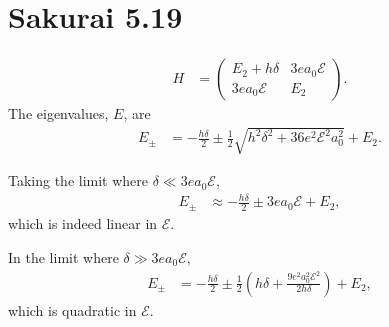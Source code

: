 \documentclass[
a4paper,
10pt,
twoside,
]{article}
\begin{document}
\section{Sakurai 5.19}\label{sec: III}

\begin{align}
	H &= \begin{pmatrix}
		E_2 + h\delta & 3ea_0\mathcal{E}\\
		3ea_0\mathcal{E} & E_2
	\end{pmatrix}.
\end{align}
The eigenvalues, $E$, are
\begin{align}
	E_\pm &= -\frac{h \delta}{2} \pm \frac{1}{2}\sqrt{h^2\delta^2 + 36e^2\mathcal{E}^2 a_0^2} + E_2.
\end{align}

Taking the limit where $\delta\ll 3ea_0\mathcal{E}$,
\begin{align}
	E_\pm &\approx -\frac{h \delta}{2} \pm 3ea_0\mathcal{E} + E_2,
\end{align}
which is indeed linear in $\mathcal{E}$.

In the limit where $\delta\gg 3ea_0\mathcal{E}$,
\begin{align}
	E_\pm &= -\frac{h \delta}{2} \pm \frac{1}{2}\left(h\delta + \frac{9e^2a_0^2\mathcal{E}^2}{2h\delta}\right) + E_2,
\end{align}
which is quadratic in $\mathcal{E}$.

\stopmcols
\end{document}
